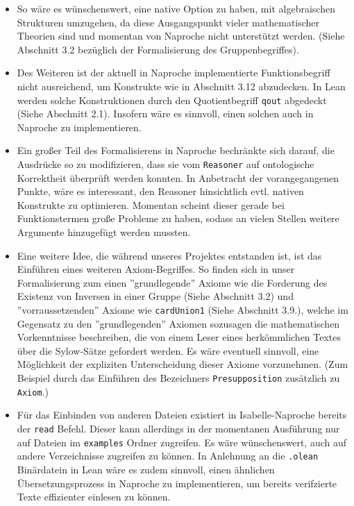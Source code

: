 \documentclass[a4paper,12pt]{scrartcl}
\begin{document}
\begin{itemize}
\item So wäre es wünschenswert, eine native Option zu haben, mit algebraischen Strukturen umzugehen, da diese Ausgangspunkt vieler mathematischer Theorien sind und momentan von Naproche nicht unterstützt werden. (Siehe Abschnitt 3.2 bezüglich der Formalisierung des Gruppenbegriffes).

\item Des Weiteren ist der aktuell in Naproche implementierte Funktionsbegriff nicht ausreichend, um Konstrukte wie in Abschnitt 3.12 abzudecken. In Lean werden solche Konstruktionen durch den Quotientbegriff \verb!qout! abgedeckt (Siehe Abschnitt 2.1). Insofern wäre es sinnvoll, einen solchen auch in Naproche zu implementieren.

\item Ein großer Teil des Formalisierens in Naproche bechränkte sich darauf, die Ausdrücke so zu modifizieren, dass sie vom \verb!Reasoner! auf ontologische Korrektheit überprüft werden konnten. In Anbetracht der vorangegangenen Punkte, wäre es interessant, den Reasoner hinsichtlich evtl. nativen Konstrukte zu optimieren. Momentan scheint dieser gerade bei Funktionstermen große Probleme zu haben, sodass an vielen Stellen weitere Argumente hinzugefügt werden mussten.

\item Eine weitere Idee, die während unseres Projektes entstanden ist, ist das Einführen eines weiteren Axiom-Begriffes. So finden sich in unser Formalisierung zum einen ''grundlegende'' Axiome wie die Forderung des Existenz von Inversen in einer Gruppe (Siehe Abschnitt 3.2) und ''vorraussetzenden'' Axiome wie \verb!cardUnion1! (Siehe Abschnitt 3.9.), welche im Gegensatz zu den ''grundlegenden'' Axiomen sozusagen die mathematischen Vorkenntnisse beschreiben, die von einem Leser eines herkömmlichen Textes über die Sylow-Sätze gefordert werden. Es wäre eventuell sinnvoll, eine Möglichkeit der expliziten Unterscheidung dieser Axiome vorzunehmen. (Zum Beispiel durch das Einführen des Bezeichners \verb!Presupposition! zusätzlich zu \verb!Axiom!.)

\item Für das Einbinden von anderen Dateien existiert in Isabelle-Naproche bereits der \verb!read! Befehl. Dieser kann allerdings in der momentanen Ausführung nur auf Dateien im \verb!examples! Ordner zugreifen.
Es wäre wünschenswert, auch auf andere Verzeichnisse zugreifen zu können. In Anlehnung an die \verb!.olean! Binärdatein in Lean wäre es zudem sinnvoll, einen ähnlichen Übersetzungsprozess in Naproche zu implementieren, um bereits verifzierte Texte effizienter einlesen zu können.


\end{itemize}
\end{document}
